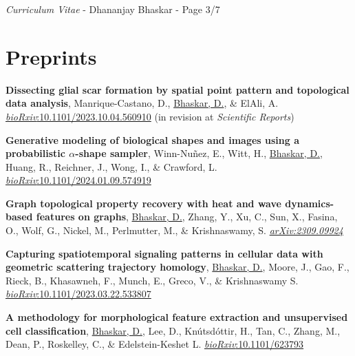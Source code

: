 \documentclass[margin,line]{res}
\begin{document}
\begin{resume}
\newpage
\begin{flushright}
\textit{Curriculum Vitae} - Dhananjay Bhaskar - Page 3/7
\end{flushright}
\vspace*{.02cm}


\section{\sc Preprints}
{
\renewcommand\leftmargini{0em}
\renewcommand{\labelenumi}{P\theenumi}
\begin{etaremune}[start=5]
\item{\bf Dissecting glial scar formation by spatial point pattern and topological data analysis},
Manrique-Castano, D., \underline{Bhaskar, D.}, \& ElAli, A. 
\href{https://doi.org/10.1101/2023.10.04.560910}{\textit{bioRxiv}:10.1101/2023.10.04.560910} (in revision at \textit{Scientific Reports})
\vspace*{.1cm}
\item{\bf Generative modeling of biological shapes and images using a probabilistic $\alpha$-shape sampler},
Winn-Nu\~{n}ez, E., Witt, H., \underline{Bhaskar, D.}, Huang, R., Reichner, J., Wong, I., \& Crawford, L.
\href{https://doi.org/10.1101/2024.01.09.574919}{\textit{bioRxiv}:10.1101/2024.01.09.574919}
\vspace*{.1cm}
\item{\bf Graph topological property recovery with heat and wave dynamics-based features on graphs},
\underline{Bhaskar, D.}, Zhang, Y., Xu, C., Sun, X., Fasina, O., Wolf, G., Nickel, M., Perlmutter, M., \& Krishnaswamy, S. 
\href{https://arxiv.org/abs/2309.09924}{\textit{arXiv:2309.09924}}
\vspace*{.1cm}
\item{\bf Capturing spatiotemporal signaling patterns in cellular data with geometric scattering trajectory homology},
\underline{Bhaskar, D.}, Moore, J., Gao, F., Rieck, B., Khasawneh, F., Munch, E., Greco, V., \& Krishnaswamy S.
\href{https://doi.org/10.1101/2023.03.22.533807}{\textit{bioRxiv}:10.1101/2023.03.22.533807}
\vspace*{.1cm}
\item{\bf A methodology for morphological feature extraction and unsupervised cell classification},
\underline{Bhaskar, D.}, Lee, D., Kn\'{u}tsd\'{o}ttir, H., Tan, C., Zhang, M., Dean, P., Roskelley, C., \& Edelstein-Keshet L.
\href{https://www.biorxiv.org/content/10.1101/623793v1.abstract}{\textit{bioRxiv}:10.1101/623793}
\end{etaremune}
}


\end{resume}
\end{document}
